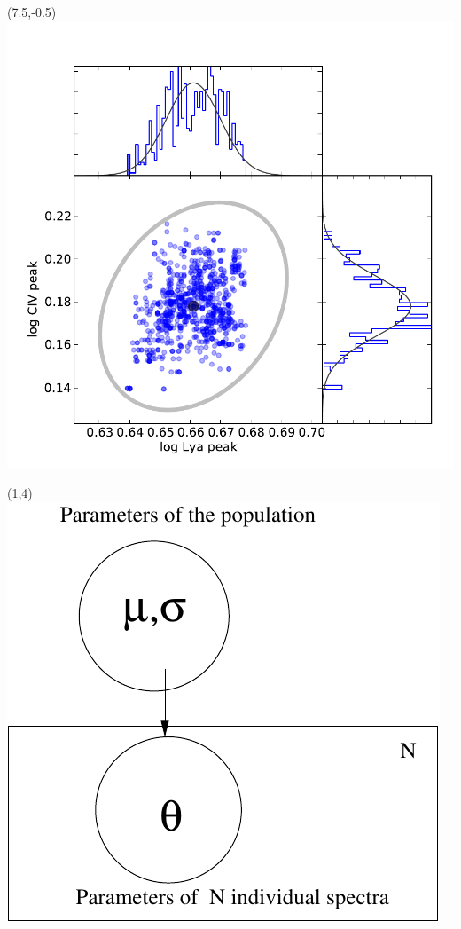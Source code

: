 \documentclass{article}
\renewcommand{\Large}       {\fontsize{20.74}{25}\selectfont}
\begin{document}
\begin{textblock}{10}(7.5,-0.5)
\includegraphics[height=4\TPVertModule]{images/qso_spectrum_posterior.pdf}\\
\end{textblock}

\begin{textblock}{8}(1,4)\Large
\includegraphics[height=4\TPVertModule]{images/plate.pdf}\\
\end{textblock}
\end{document}
